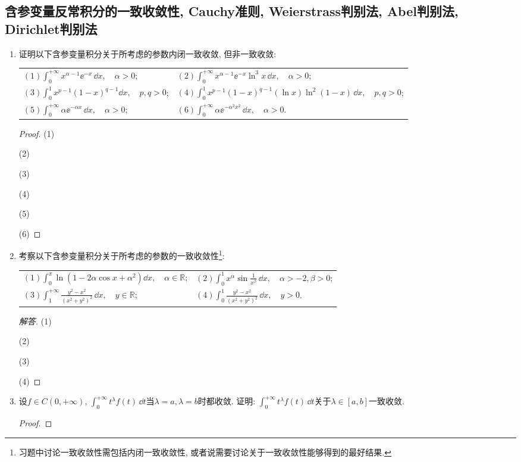 \subsection{含参变量反常积分的一致收敛性, Cauchy准则, Weierstrass判别法, Abel判别法, Dirichlet判别法}
\begin{a}
\begin{enumerate}
\item 证明以下含参变量积分关于所考虑的参数内闭一致收敛, 但非一致收敛:
\begin{center}\begin{tabular}{ll}
\((1)\int_{0}^{+\infty}x^{\alpha-1}\ee^{-x}\,\dd x,\quad\alpha>0\);&
\((2)\int_{0}^{+\infty}x^{\alpha-1}\ee^{-x}\ln^3x\,\dd x,\quad\alpha>0\);\\
\((3)\int_{0}^{1}x^{p-1}(1-x)^{q-1}\dd x,\quad p,q>0\);&
\((4)\int_{0}^{1}x^{p-1}(1-x)^{q-1}\left(\ln x\right)\ln^2(1-x)\,\dd x,\quad p,q>0\);\\
\((5)\int_{0}^{+\infty}\alpha\ee^{-\alpha x}\,\dd x,\quad\alpha>0\);&
\((6)\int_{0}^{+\infty}\alpha\ee^{-\alpha^2x^2}\,\dd x,\quad\alpha>0\).
\end{tabular}\end{center}
\begin{proof}
(1)

(2)

(3)

(4)

(5)

(6)
\end{proof}
\item 考察以下含参变量积分关于所考虑的参数的一致收敛性\footnote{习题中讨论一致收敛性需包括内闭一致收敛性, 或者说需要讨论关于一致收敛性能够得到的最好结果.}:
\begin{center}\begin{tabular}{ll}
\((1)\int_{0}^{\pi}\ln\left(1-2\alpha\cos x+\alpha^2\right)\dd x,\quad\alpha\in\mathbb{R}\);&
\((2)\int_{0}^{1}x^{\alpha}\sin\frac{1}{x^\beta}\,\dd x,\quad\alpha>-2,\beta>0\);\\
\((3)\int_{1}^{+\infty}\frac{y^2-x^2}{(x^2+y^2)^2}\,\dd x,\quad y\in\mathbb{R}\);&
\((4)\int_{0}^{1}\frac{y^2-x^2}{(x^2+y^2)^2}\,\dd x,\quad y>0\).
\end{tabular}\end{center}
\begin{proof}[解答]
(1)

(2)

(3)

(4)
\end{proof}
\item 设\(f\in C(0,+\infty)\), \(\int_{0}^{+\infty}t^\lambda f(t)\,\dd t\)当\(\lambda=a,\lambda=b\)时都收敛. 
证明: \(\int_{0}^{+\infty}t^\lambda f(t)\,\dd t\)关于\(\lambda\in[a,b]\)一致收敛.
\begin{proof}

\end{proof}
\end{enumerate}
\end{a}

